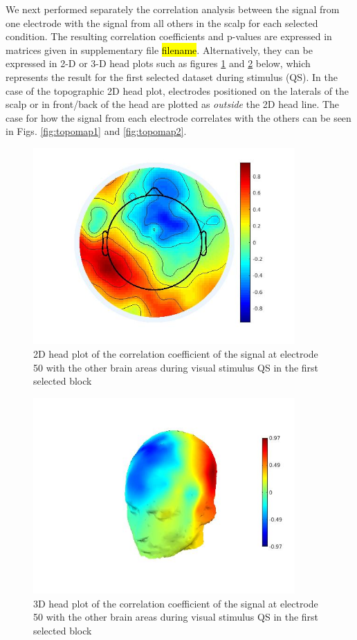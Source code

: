\documentclass[a4paper]{article}
\begin{document}
We next performed separately the correlation analysis between the signal from one electrode with the signal from all others in the scalp for each selected condition. The resulting correlation coefficients and p-values are expressed in matrices given in supplementary file \hl{filename}. Alternatively, they can be expressed in 2-D or 3-D head plots such as figures \ref{fig:topoplot} and \ref{fig:headplot} below, which represents the result for the first selected dataset during stimulus (QS). In the case of the topographic 2D head plot, electrodes positioned on the laterals of the scalp or in front/back of the head are plotted as \textit{outside} the 2D head line. The case for how the signal from each electrode correlates with the others can be seen in Figs. \ref{fig:topomap1} and \ref{fig:topomap2}.

\begin{figure}[H]
    \centering
    \includegraphics[width=10cm]{topoplot.jpg}
    \caption{2D head plot of the correlation coefficient of the signal at electrode 50 with the other brain areas during visual stimulus QS in the first selected block}
    \label{fig:topoplot}
\end{figure}

\begin{figure}[H]
    \centering
    \includegraphics[width=10cm]{headplot.jpg}
    \caption{3D head plot of the correlation coefficient of the signal at electrode 50 with the other brain areas during visual stimulus QS in the first selected block}
    \label{fig:headplot}
\end{figure}
\end{document}
